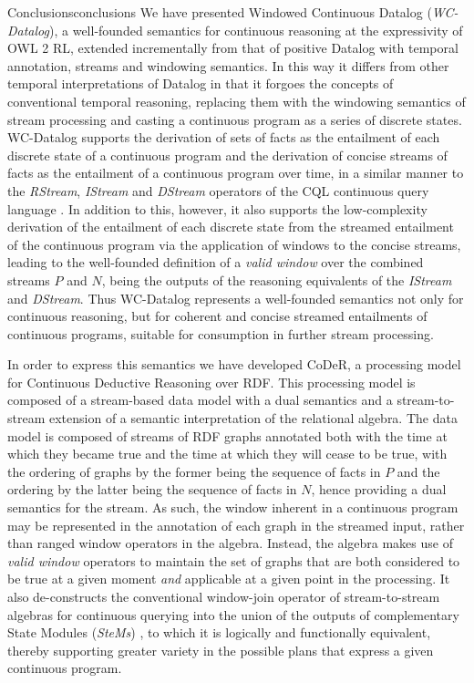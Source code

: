 \begin{nestedsection}{Conclusions}{conclusions}
	We have presented Windowed Continuous Datalog (\emph{WC-Datalog}), a well-founded semantics for continuous reasoning at the expressivity of OWL 2 RL, extended incrementally from that of positive Datalog with temporal annotation, streams and windowing semantics.
	In this way it differs from other temporal interpretations of Datalog \citep{OrgunWadge92,Tuzhilin93} in that it forgoes the concepts of conventional temporal reasoning, replacing them with the windowing semantics of stream processing and casting a continuous program as a series of discrete states.
	WC-Datalog supports the derivation of sets of facts as the entailment of each discrete state of a continuous program and the derivation of concise streams of facts as the entailment of a continuous program over time, in a similar manner to the \emph{RStream}, \emph{IStream} and \emph{DStream} operators of the CQL continuous query language \citep{CQL}.
	In addition to this, however, it also supports the low-complexity derivation of the entailment of each discrete state from the streamed entailment of the continuous program via the application of windows to the concise streams, leading to the well-founded definition of a \emph{valid window} over the combined streams $P$ and $N$, being the outputs of the reasoning equivalents of the \emph{IStream} and \emph{DStream}.
	Thus WC-Datalog represents a well-founded semantics not only for continuous reasoning, but for coherent and concise streamed entailments of continuous programs, suitable for consumption in further stream processing.

	In order to express this semantics we have developed CoDeR, a processing model for Continuous Deductive Reasoning over RDF.
	This processing model is composed of a stream-based data model with a dual semantics and a stream-to-stream extension of a semantic interpretation of the relational algebra.
	The data model is composed of streams of RDF graphs annotated both with the time at which they became true and the time at which they will cease to be true, with the ordering of graphs by the former being the sequence of facts in $P$ and the ordering by the latter being the sequence of facts in $N$, hence providing a dual semantics for the stream.
	As such, the window inherent in a continuous program may be represented in the annotation of each graph in the streamed input, rather than ranged window operators in the algebra.
	Instead, the algebra makes use of \emph{valid window} operators to maintain the set of graphs that are both considered to be true at a given moment \emph{and} applicable at a given point in the processing.
	It also de-constructs the conventional window-join operator of stream-to-stream algebras for continuous querying into the union of the outputs of complementary State Modules (\emph{SteMs}) \citep{SteMs}, to which it is logically and functionally equivalent, thereby supporting greater variety in the possible plans that express a given continuous program.


\end{nestedsection}
